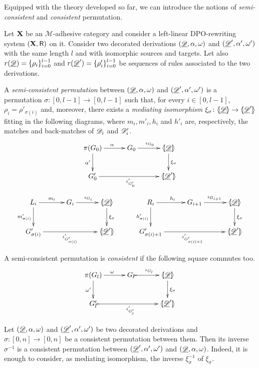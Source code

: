 Equipped with the theory developed so far, we can introduce the notions of \emph{semi-consistent} and \emph{consistent} permutation.

\begin{definition}\label{def:permcon}
	Let $\textbf {\textup{X}}$ be an $\mathcal{M}$-adhesive category and consider a left-linear DPO-rewriting system $(\textbf {\textup{X}}, \mathsf{R})$ on it.  Consider two decorated derivations $(\underline{\mathscr{D}}, \alpha, \omega)$ and  $(\underline{\mathscr{D}}', \alpha', \omega')$ with the same length $l$ and with isomorphic sources and targets. Let also $r(\underline{\mathscr{D}})=\{\rho_i\}_{i=0}^{l-1}$ and $r(\underline{\mathscr{D}}')=\{\rho'_i\}_{i=0}^{l-1}$	be sequences of rules associated to the two derivations.
	
	A \emph{semi-consistent permutation} between  $(\underline{\mathscr{D}}, \alpha, \omega)$ and $(\underline{\mathscr{D}}', \alpha', \omega')$ is a permutation $\sigma\colon [0,l-1]\to [0,l-1]$  such that, for every $i\in [0,l-1]$, $\rho_i=\rho'_{\sigma(i)}$ and, moreover, there exists a \emph{mediating isomorphism} $\xi_\sigma\colon \langle \hspace{-1.85pt}[ \underline{\mathscr{D}}]\hspace{-1.85pt}\rangle \to \langle \hspace{-1.85pt}[ \underline{\mathscr{D}}' ]\hspace{-1.85pt}\rangle$ fitting in the following diagrams, where $m_i, m'_i, h_i$ and $h'_i$ are, respectively, the matches and back-matches of $\mathscr{D}_i$ and $\mathscr{D}'_i$.
	\[\xymatrix@C=30pt{\pi(G_0)\ar[r]^{\alpha} \ar[d]_{\alpha'} & G_0 \ar[r]^{\iota_{G_0}} &\tpro{D} \ar[d]^{\xi_\sigma}\\ G'_0 \ar[rr]_{\iota'_{G'_0}} & &\lpro \der{D}' \rpro}\]
	\[\xymatrix@C=30pt{L_i \ar[r]^{m_i} \ar[d]_{m'_{\sigma(i)}}& G_i \ar[r]^{\iota_{G_i}} &\tpro{D} \ar[d]^{\xi_\sigma} & R_i \ar[r]^{h_i} \ar[d]_{h'_{\sigma(i)}}& G_{i+1} \ar[r]^{\iota_{G_{i+1}}} &\tpro{D} \ar[d]^{\xi_\sigma} \\G'_{\sigma(i)} \ar[rr]_{\iota'_{G'_{\sigma(i)}}}&& \lpro \der{D}' \rpro& G'_{\sigma(i)+1} \ar[rr]_{\iota'_{G'_{\sigma(i)+1}}}&& \lpro \der{D}' \rpro}\]
	
	A semi-consistent permutation is \emph{consistent} if the following square commutes too.
	\[\xymatrix@C=30pt{ \pi(G_{l}) \ar[r]^{\omega} \ar[d]_{\omega'} & G_{l} \ar@{>->}[r]^{\iota_{G_{l}}} &\tpro{D} \ar[d]^{\xi_\sigma} \\  G'_{l} \ar@{>->}[rr]_{\iota'_{G'_{l}}} & &\lpro \der{D}' \rpro}\]
\end{definition}

\begin{remark}\label{rem:inversa}
	Let  $(\underline{\mathscr{D}},\alpha, \omega)$ and $(\underline{\mathscr{D}}', \alpha', \omega')$ be two decorated derivations and $\sigma\colon [0,n]\to [0,n]$ be a consistent permutation between them.  Then its inverse $\sigma^{-1}$ is a consistent permutation between $(\underline{\mathscr{D}}', \alpha', \omega')$ and $(\underline{\mathscr{D}},\alpha, \omega)$. Indeed, it is enough to consider, as mediating isomorphism, the inverse $\xi^{-1}_\sigma$ of $\xi_\sigma$.
\end{remark}

